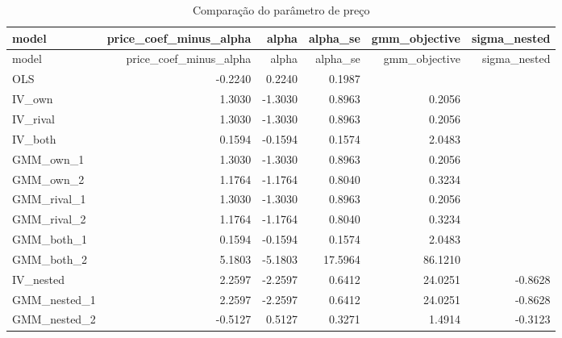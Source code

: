 \begingroup
\scriptsize
\begin{longtable}{@{}lrrrrr@{}}
\caption{Comparação do parâmetro de preço}\label{tab:price-compare}\\
\toprule
model & price\_coef\_minus\_alpha & alpha & alpha\_se & gmm\_objective & sigma\_nested \\
\midrule
\endfirsthead
\toprule
model & price\_coef\_minus\_alpha & alpha & alpha\_se & gmm\_objective & sigma\_nested \\
\midrule
\endhead
OLS & -0.2240 & 0.2240 & 0.1987 &  &  \\
IV\_own & 1.3030 & -1.3030 & 0.8963 & 0.2056 &  \\
IV\_rival & 1.3030 & -1.3030 & 0.8963 & 0.2056 &  \\
IV\_both & 0.1594 & -0.1594 & 0.1574 & 2.0483 &  \\
GMM\_own\_1 & 1.3030 & -1.3030 & 0.8963 & 0.2056 &  \\
GMM\_own\_2 & 1.1764 & -1.1764 & 0.8040 & 0.3234 &  \\
GMM\_rival\_1 & 1.3030 & -1.3030 & 0.8963 & 0.2056 &  \\
GMM\_rival\_2 & 1.1764 & -1.1764 & 0.8040 & 0.3234 &  \\
GMM\_both\_1 & 0.1594 & -0.1594 & 0.1574 & 2.0483 &  \\
GMM\_both\_2 & 5.1803 & -5.1803 & 17.5964 & 86.1210 &  \\
IV\_nested & 2.2597 & -2.2597 & 0.6412 & 24.0251 & -0.8628 \\
GMM\_nested\_1 & 2.2597 & -2.2597 & 0.6412 & 24.0251 & -0.8628 \\
GMM\_nested\_2 & -0.5127 & 0.5127 & 0.3271 & 1.4914 & -0.3123 \\
\bottomrule
\end{longtable}
\endgroup